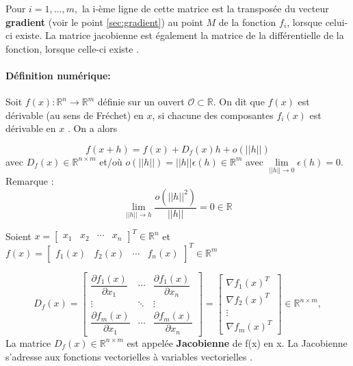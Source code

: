 Pour $i = 1, … , m,$ la i-ème ligne de cette matrice est la transposée du vecteur \textbf{gradient} (voir le point \ref{sec:gradient}) au point $M$ de la fonction $f_i$, lorsque celui-ci existe. La matrice jacobienne est également la matrice de la différentielle de la fonction, lorsque celle-ci existe \cite{jtshiman:2021}.
\paragraph*{Définition numérique:}

Soit $f(x) : \mathbb{R}^n \to \mathbb{R}^m$ définie sur un ouvert $ \mathcal{O} \subset \mathbb{R} $. On dit que $f(x)$ est dérivable
(au sens de Fréchet) en $x$, si chacune des composantes $f_i(x)$ est dérivable  en $x$ \cite{bierlaire2006introduction}. On a alors

\begin{equation}
f(x + h) = f(x) + D_f (x)h + o(||h||)
\end{equation}
avec $D_f (x) \in  \mathbb{R}^{n \times m} $ et/où $ o(||h||)=||h|| \epsilon(h) \in \mathbb{R}^m $ avec $\lim\limits_{||h|| \to 0} \epsilon(h) = 0 $.
Remarque :
$$
\lim\limits_{||h|| \to h} \frac{o(||h||^2)}{||h||} = 0  \in \mathbb{R}
$$

Soient 
$x = 
\begin{bmatrix}
x_1 & x_2& \cdots & x_n
\end{bmatrix}^{T}
\in \mathbb{R}^n $ et $ 
f(x) = 
\begin{bmatrix}
f_1(x) & f_2(x)& \cdots & f_n(x)
\end{bmatrix}^{T} \in \mathbb{R}^m
$

$$
D_f\left(x\right)={
	\begin{bmatrix}
	{\dfrac {\partial f_{1}(x)}{\partial x_{1}}}&\cdots &{\dfrac {\partial f_{1}(x)}{\partial x_{n}}}\\
	\vdots &\ddots &\vdots \\
	{\dfrac {\partial f_{m}(x)}{\partial x_{1}}}&\cdots &{\dfrac {\partial f_{m}(x)}{\partial x_{n}}}
	\end{bmatrix}}
=
\begin{bmatrix}
\nabla f_1(x)^T \\ \nabla f_2(x)^T\\ \vdots \\ \nabla f_m(x)^T
\end{bmatrix}
\in  \mathbb{R}^{n \times m},
$$
La matrice $D_f (x) \in  \mathbb{R}^{n \times m} $ est appelée \textbf{Jacobienne} de f(x) en x.
La Jacobienne s’adresse aux fonctions vectorielles à variables vectorielles \cite{jtshiman:2021}.

